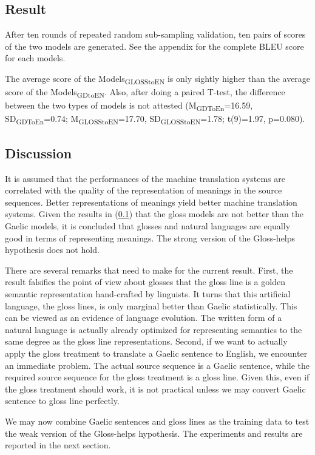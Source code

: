 \documentclass[11pt,a4paper]{article}
\begin{document}
\subsection{Result} \label{gdglen_results}
After ten rounds of repeated random sub-sampling validation, ten pairs of scores of the two models are generated. See the appendix for the complete BLEU score for each models.

The average score of the Models\textsubscript{GLOSStoEN} is only sightly higher than the average score of the Models\textsubscript{GDtoEN}.
Also, after doing a paired T-test, the difference between the two types of models is not attested
(M\textsubscript{GDToEn}=16.59, SD\textsubscript{GDToEn}=0.74; M\textsubscript{GLOSStoEN}=17.70, SD\textsubscript{GLOSStoEN}=1.78; t(9)=1.97, p=0.080). 

\subsection{Discussion}
It is assumed that the performances of the machine translation systems are correlated with the quality of the representation of meanings in the source sequences. Better representations of meanings yield better machine translation systems. Given the results in (\ref{gdglen_results}) that the gloss models are not better than the Gaelic models, it is concluded that glosses and natural languages are equally good in terms of representing meanings. The strong version of the Gloss-helps hypothesis does not hold.

There are several remarks that need to make for the current result. First, the result falsifies the point of view about glosses that the gloss line is a golden semantic representation hand-crafted by linguists.
It turns that this artificial language, the gloss lines, is only marginal better than Gaelic statistically. This can be viewed as an evidence of language evolution.
The written form of a natural language is actually already optimized for representing semantics to the same degree as the gloss line representations.
Second, if we want to actually apply the gloss treatment to translate a Gaelic sentence to English, we encounter an immediate problem. The actual source sequence is a Gaelic sentence, while the required source sequence for the gloss treatment is a gloss line. Given this, even if the gloss treatment should work, it is not practical unless we may convert Gaelic sentence to gloss line perfectly.      

We may now combine Gaelic sentences and gloss lines as the training data to test the weak version of the Gloss-helps hypothesis. The experiments and results are reported in the next section.
\end{document}
